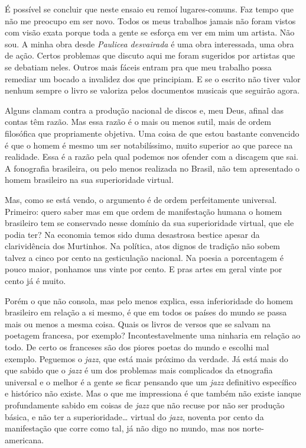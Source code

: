 É possível se concluir que neste ensaio eu remoí lugares-comuns. Faz
tempo que não me preocupo em ser novo. Todos os meus trabalhos jamais
não foram vistos com visão exata porque toda a gente se esforça em ver
em mim um artista. Não sou. A minha obra desde \textit{Paulicea desvairada} é
uma obra interessada, uma obra de ação. Certos problemas que discuto
aqui me foram sugeridos por artistas que se debatiam neles. Outros mais
fáceis entram pra que meu trabalho possa remediar um bocado a invalidez
dos que principiam. E se o escrito não tiver valor nenhum sempre o livro
se valoriza pelos documentos musicais que seguirão agora.




Alguns clamam contra a produção nacional de discos e, meu Deus, afinal
das contas têm razão. Mas essa razão é o mais ou menos sutil, mais de
ordem filosófica que propriamente objetiva. Uma coisa de que estou
bastante convencido é que o homem é mesmo um ser notabilíssimo, muito
superior ao que parece na realidade. Essa é a razão pela qual podemos
nos ofender com a discagem que sai. A fonografia brasileira, ou pelo
menos realizada no Brasil, não tem apresentado o homem brasileiro na sua
superioridade virtual.

Mas, como se está vendo, o argumento é de ordem perfeitamente universal.
Primeiro: quero saber mas em que ordem de manifestação humana o homem
brasileiro tem se conservado nesse domínio da sua superioridade virtual,
que ele podia ter? Na economia temos sido duma desastrosa bestice apesar
da clarividência dos Murtinhos. Na política, atos dignos de tradição não
sobem talvez a cinco por cento na gesticulação nacional. Na poesia a
porcentagem é pouco maior, ponhamos uns vinte por cento. E pras artes em
geral vinte por cento já é muito.

Porém o que não consola, mas pelo menos explica, essa inferioridade do
homem brasileiro em relação a si mesmo, é que em todos os países do
mundo se passa mais ou menos a mesma coisa. Quais os livros de versos
que se salvam na poetagem francesa, por exemplo? Incontestavelmente uma
ninharia em relação ao todo. De certo os franceses são dos piores poetas
do mundo e escolhi mal exemplo. Peguemos o \emph{jazz}, que está mais
próximo da verdade. Já está mais do que sabido que o \emph{jazz} é um
dos problemas mais complicados da etnografia universal e o melhor é a
gente se ficar pensando que um \emph{jazz} definitivo específico e
histórico não existe. Mas o que me impressiona é que também não existe
ianque profundamente sabido em coisas de \emph{jazz} que não recuse por
não ser produção básica, e não ter a superioridade\ldots{} virtual do
\emph{jazz}, noventa por cento da manifestação que corre como tal, já
não digo no mundo, mas nos norte-americana.

